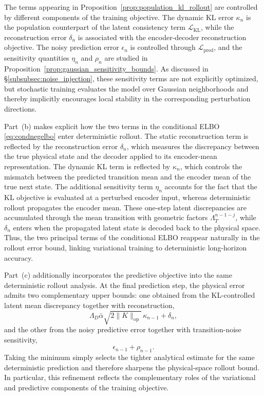 \documentclass[11pt]{article}
\begin{document}
\begin{remark}
\label{rem:population_rollout_interpretation}
The terms appearing in Proposition~\ref{prop:population_kl_rollout} are controlled by different components of the training objective. The dynamic KL error $\kappa_n$ is the population counterpart of the latent consistency term $\mathcal L_{\mathrm{KL}}$, while the reconstruction error $\delta_n$ is associated with the encoder-decoder reconstruction objective. The noisy prediction error $\epsilon_n$ is controlled through $\mathcal L_{\mathrm{pred}}$, and the sensitivity quantities $\eta_n$ and $\rho_n$ are studied in Proposition~\ref{prop:gaussian_sensitivity_bounds}. As discussed in \S\ref{subsubsec:noise_injection}, these sensitivity terms are not explicitly optimized, but stochastic training evaluates the model over Gaussian neighborhoods and thereby implicitly encourages local stability in the corresponding perturbation directions.

Part~(b) makes explicit how the two terms in the conditional ELBO \eqref{eq:condnegelbo} enter deterministic rollout. The static reconstruction term is reflected by the reconstruction error $\delta_n$, which measures the discrepancy between the true physical state and the decoder applied to its encoder-mean representation. The dynamic KL term is reflected by $\kappa_n$, which controls the mismatch between the predicted transition mean and the encoder mean of the true next state. The additional sensitivity term $\eta_n$ accounts for the fact that the KL objective is evaluated at a perturbed encoder input, whereas deterministic rollout propagates the encoder mean. These one-step latent discrepancies are accumulated through the mean transition with geometric factors $\Lambda_T^{n-1-j}$, while $\delta_n$ enters when the propagated latent state is decoded back to the physical space. Thus, the two principal terms of the conditional ELBO reappear naturally in the rollout error bound, linking variational training to deterministic long-horizon accuracy.

Part~(c) additionally incorporates the predictive objective into the same deterministic rollout analysis. At the final prediction step, the physical error admits two complementary upper bounds: one obtained from the KL-controlled latent mean discrepancy together with reconstruction,
\[
    \Lambda_D\bar\alpha\sqrt{2\|K\|_{\mathrm{op}}}\,
    \kappa_{n-1}+\delta_n,
\]
and the other from the noisy predictive error together with transition-noise sensitivity,
\[
    \epsilon_{n-1}+\rho_{n-1}.
\]
Taking the minimum simply selects the tighter analytical estimate for the same deterministic prediction and therefore sharpens the physical-space rollout bound. In particular, this refinement reflects the complementary roles of the variational and predictive components of the training objective.


\end{remark}
\end{document}
